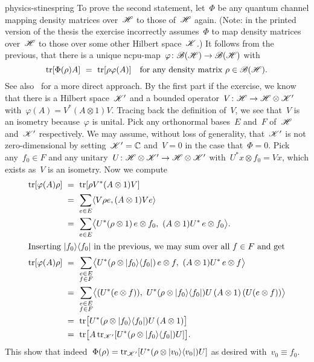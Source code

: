 \begin{solution}{physics-stinespring}
To prove the second statement,
    let~$\Phi$ be any quantum channel
    mapping density matrices over~$\mathscr{H}$ to those of~$\mathscr{H}$ again.
(Note: in the printed version of the thesis
    the exercise incorrectly
    assumes~$\Phi$ to map density matrices over~$\mathscr{H}$
    to those over some other Hilbert space~$\mathscr{K}$.)
It follows from the previous, that there is a unique
        ncpu-map~$\varphi\colon \mathscr{B}(\mathscr{H}) \to \mathscr{B}(\mathscr{H})$ with
\begin{equation*}
    \mathop{\mathrm{tr}}[ \Phi(\rho) A] \ = \ \mathop{\mathrm{tr}}[\rho \varphi(A)]
        \quad\text{for any density matrix~$\rho\in \mathscr{B}(\mathscr{H})$}.
\end{equation*}
See also~\cite{tomamichel} for a more direct approach.
By the first part if the exercise,
    we know that there is a Hilbert space~$\mathscr{K}'$
    and a bounded operator~$V \colon \mathscr{H} \to \mathscr{H} \otimes \mathscr{K}'$
    with~$\varphi (A) = V^* (A \otimes 1) V$.
Tracing back the definition of~$V$, we see that~$V$
    is an isometry because~$\varphi$ is unital.
Pick any orthonormal bases~$E$ and~$F$ of~$\mathscr{H}$ and~$\mathscr{K}'$
    respectively.
We may assume, without loss of generality,
    that~$\mathscr{K}'$ is not zero-dimensional
    by setting~$\mathscr{K}' =\mathbb{C}$ and~$V = 0$
    in the case that~$\Phi = 0$.
Pick any~$f_0 \in F$
    and any unitary~$U\colon \mathscr{H} \otimes \mathscr{K}' \to \mathscr{H} \otimes \mathscr{K}'$
    with~$U^* x \otimes f_0 = V x$,
    which exists as~$V$ is an isometry.
Now we compute
\begin{align*}
    \TR [\varphi(A) \rho ]
    & \ = \ \TR[\rho V^* (A \otimes 1) V] \\
    & \ = \ \sum_{e \in E} \langle V \rho e, (A \otimes 1) V e \rangle \\
    & \ = \ \sum_{e \in E}
    \bigl\langle U^* (\rho \otimes 1) \,e\otimes f_0 ,
    \ (A \otimes 1) U^* \,e\otimes f_0 \bigr\rangle. \\
\intertext{Inserting~$\ketbra{f_0}{f_0}$
    in the previous,
    we may sum over all~$f \in F$ and get}
     \TR[\varphi(A) \rho] &\ = \ \sum_{\substack{e \in E \\ f\in F}}
    \bigl\langle U^* (\rho \otimes \ketbra{f_0}{f_0}) \,e\otimes f ,
    \ (A \otimes 1) U^* \,e\otimes f \bigr\rangle \\
    & \ = \ \sum_{\substack{e \in E \\ f\in F}}
    \bigl\langle
    (U^* (e\otimes f)) , \ 
    U^* (\rho \otimes \ketbra{f_0}{f_0})U \,
    (A \otimes 1) \,(U (e\otimes f)) \bigr\rangle \\
    & \ = \ 
    \TR \bigl[
    U^* (\rho \otimes \ketbra{f_0}{f_0})U \,
    (A \otimes 1)  \bigr] \\
& \ = \ 
\TR \bigl[ A   \TR\nolimits_{\scrK'}[ U^* (\rho \otimes \ketbra{f_0}{f_0} ) U] \bigr].
\end{align*}
This show that indeed~$\Phi(\rho)
    = \mathop{\mathrm{tr}}_{\mathscr{K}'}[ U^* (\rho \otimes \left|v_0\right>\!\left<v_0\right|)U]$
    as desired with~$v_0 \equiv f_0$.
\end{solution}
